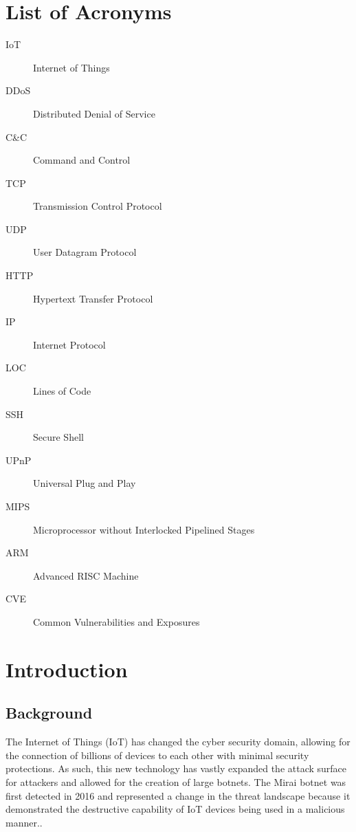 \documentclass[12pt,letterpaper]{report}
\begin{document}
\chapter*{List of Acronyms}
\begin{description}
    \item[IoT] Internet of Things
    \item[DDoS] Distributed Denial of Service
    \item[C\&C] Command and Control
    \item[TCP] Transmission Control Protocol
    \item[UDP] User Datagram Protocol
    \item[HTTP] Hypertext Transfer Protocol
    \item[IP] Internet Protocol
    \item[LOC] Lines of Code
    \item[SSH] Secure Shell
    \item[UPnP] Universal Plug and Play
    \item[MIPS] Microprocessor without Interlocked Pipelined Stages
    \item[ARM] Advanced RISC Machine
    \item[CVE] Common Vulnerabilities and Exposures
\end{description}

\chapter{Introduction}

\section{Background}


The Internet of Things (IoT) has changed the cyber security domain, allowing for the connection of billions of devices to each other with minimal security protections. As such, this new technology has vastly expanded the attack surface for attackers and allowed for the creation of large botnets. The Mirai botnet was first detected in 2016 and represented a change in the threat landscape because it demonstrated the destructive capability of IoT devices being used in a malicious manner.\cite{antonakakis2017understanding}.
\end{document}
